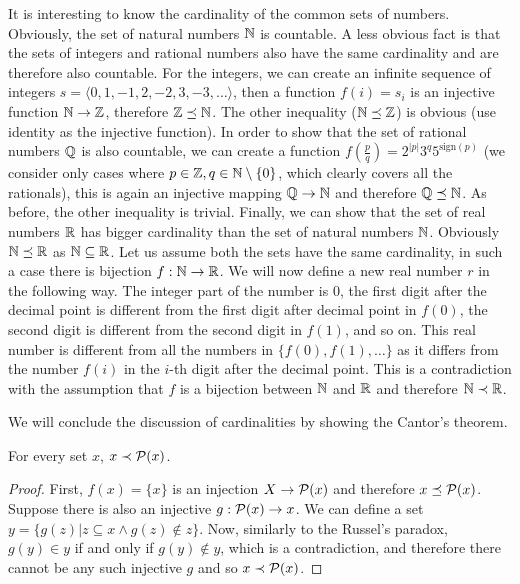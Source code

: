 It is interesting to know the cardinality of the common sets of numbers. Obviously, the set of natural numbers $\mathbb{N}$ is countable. A less obvious fact is that the sets of integers and rational numbers also have the same cardinality and are therefore also countable. For the integers, we can create an infinite sequence of integers $s = \langle 0, 1, -1, 2, -2, 3, -3, \dots \rangle$, then a function $f(i) = s_i$ is an injective function $\mathbb{N} \to \mathbb{Z}$, therefore $\mathbb{Z} \preceq \mathbb{N}$. The other inequality ($\mathbb{N} \preceq \mathbb{Z}$) is obvious (use identity as the injective function). In order to show that the set of rational numbers $\mathbb{Q}$ is also countable, we can create a function $f(\frac{p}{q}) = 2^{|p|}3^q5^{\mathrm{sign}(p)}$ (we consider only cases where $p \in \mathbb{Z}, q \in \mathbb{N} \setminus \{0\}$, which clearly covers all the rationals), this is again an injective mapping $\mathbb{Q} \to \mathbb{N}$ and therefore $\mathbb{Q} \preceq \mathbb{N}$. As before, the other inequality is trivial. Finally, we can show that the set of real numbers ${\mathbb{R}}$ has bigger cardinality than the set of natural numbers $\mathbb{N}$. Obviously $\mathbb{N} \preceq {\ensuremath{\mathbb{R}}}$ as $\mathbb{N} \subseteq {\ensuremath{\mathbb{R}}}$. Let us assume both the sets have the same cardinality, in such a case there is bijection $f: \mathbb{N} \to {\ensuremath{\mathbb{R}}}$. We will now define a new real number $r$ in the following way. The integer part of the number is 0, the first digit after the decimal point is different from the first digit after decimal point in $f(0)$, the second digit is different from the second digit in $f(1)$, and so on. This real number is different from all the numbers in $\{f(0), f(1), \dots\}$ as it differs from the number $f(i)$ in the $i$-th digit after the decimal point. This is a contradiction with the assumption that $f$ is a bijection between $\mathbb{N}$ and ${\mathbb{R}}$ and therefore $\mathbb{N} \prec {\ensuremath{\mathbb{R}}}$.

We will conclude the discussion of cardinalities by showing the Cantor's theorem.

\begin{theorem}[Cantor]
For every set $x$, $x \prec \mathcal{P}(x)$.
\end{theorem}

\begin{proof}
First, $f(x) = \{x\}$ is an injection $X \to \mathcal{P}(x)$ and therefore $x \preceq \mathcal{P} (x)$. Suppose there is also an injective $g: \mathcal{P} (x) \to x$. We can define a set $y = \{g(z)|z \subseteq x \land g(z) \notin z\}$. Now, similarly to the Russel's paradox, $g(y) \in y$ if and only if $g(y) \notin y$, which is a contradiction, and therefore there cannot be any such injective $g$ and so $x \prec \mathcal{P}(x)$.
\end{proof}

